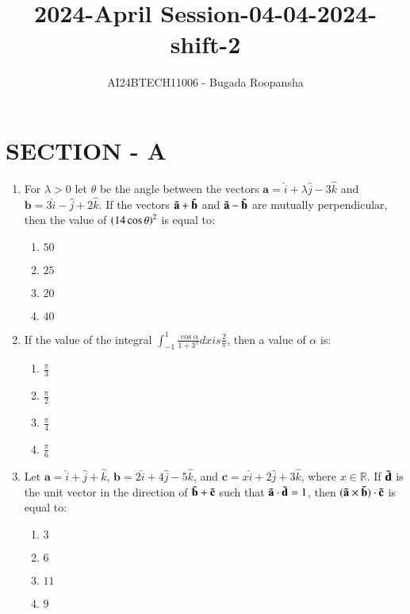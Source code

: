 \documentclass[journal,12pt,twocolumn]{IEEEtran}
\theoremstyle{remark}
\begin{document}

\vspace{3cm}
\title{2024-April Session-04-04-2024-shift-2}
\author{AI24BTECH11006 - Bugada Roopansha}
\maketitle
\section{SECTION - A}
\begin{enumerate}[start=16]
\item For $\lambda > 0$ let $\theta$ be the angle between the vectors $\mathbf{a} = \hat{i} + \lambda \hat{j} - 3 \hat{k}$ and $\mathbf{b} = 3 \hat{i} - \hat{j} + 2 \hat{k}$. If the vectors $\mathbf{\Bar{a}} + \mathbf{\Bar{b}}$ and $\mathbf{\Bar{a}} - \mathbf{\Bar{b}}$ are mutually perpendicular, then the value of $\left(14 \cos \theta\right)^2$ is equal to:
    \begin{enumerate}
        \item $50$
        \item $25$
        \item $20$
        \item $40$
    \end{enumerate}

    \item If the value of the integral $\int_{-1}^{1} \frac{\cos \alpha}{1 + 3^x}dx is \frac{2}{\pi}$, then a value of $\alpha$ is:
    \begin{enumerate}
        \item $\frac{\pi}{3}$
        \item $\frac{\pi}{2}$
        \item $\frac{\pi}{4}$
        \item $\frac{\pi}{6}$
    \end{enumerate}

    \item Let $\mathbf{a} = \hat{i} + \hat{j} + \hat{k}$, $\mathbf{b} = 2 \hat{i} + 4 \hat{j} - 5 \hat{k}$, and $\mathbf{c} = x \hat{i} + 2 \hat{j} + 3 \hat{k}$, where $x \in \mathbb{R}$. If $\mathbf{\Bar{d}}$ is the unit vector in the direction of $\mathbf{\Bar{b}} + \mathbf{\Bar{c}}$ such that $\mathbf{\Bar{a}} \cdot \mathbf{\Bar{d}} = 1$, then $(\mathbf{\Bar{a}} \times \mathbf{\Bar{b}}) \cdot \mathbf{\Bar{c}}$ is equal to:
    \begin{enumerate}
        \item $3$
        \item $6$
        \item $11$
        \item $9$
    \end{enumerate}


\end{enumerate}
\end{document}
